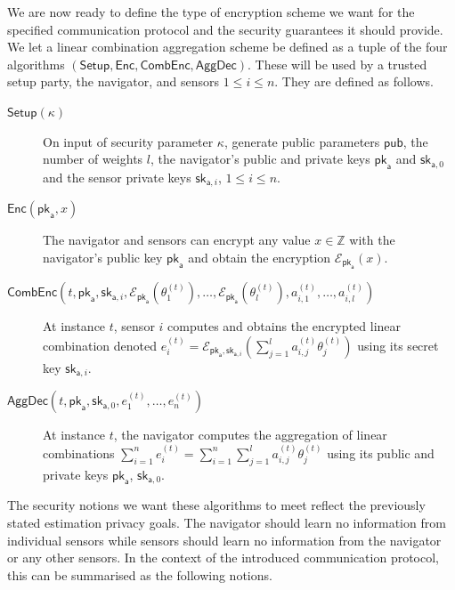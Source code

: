 We are now ready to define the type of encryption scheme we want for the specified communication protocol and the security guarantees it should provide. We let a linear combination aggregation scheme be defined as a tuple of the four algorithms $(\mathsf{Setup}, \mathsf{Enc}, \mathsf{CombEnc}, \mathsf{AggDec})$. These will be used by a trusted setup party, the navigator, and sensors $1\leq i\leq n$. They are defined as follows.
\begin{description}
    \item[$\mathsf{Setup}(\kappa)$] On input of security parameter $\kappa$, generate public parameters $\mathsf{pub}$, the number of weights $l$, the navigator's public and private keys $\mathsf{pk}_{\mathsf{a}}$ and $\mathsf{sk}_{\mathsf{a},0}$ and the sensor private keys $\mathsf{sk}_{\mathsf{a},i}$, $1\leq i\leq n$.
    \item[$\mathsf{Enc}(\mathsf{pk}_{\mathsf{a}}, x)$] The navigator and sensors can encrypt any value $x\in\mathbb{Z}$ with the navigator's public key $\mathsf{pk}_{\mathsf{a}}$ and obtain the encryption $\mathcal{E}_{\mathsf{pk}_{\mathsf{a}}}(x)$.
    \item[$\mathsf{CombEnc}(t, \mathsf{pk}_{\mathsf{a}}, \mathsf{sk}_{\mathsf{a},i}, \mathcal{E}_{\mathsf{pk}_{\mathsf{a}}}(\theta_1^{(t)}),\dots,\mathcal{E}_{\mathsf{pk}_{\mathsf{a}}}(\theta_l^{(t)}), a^{(t)}_{i,1},\dots,a^{(t)}_{i,l})$] At instance $t$, sensor $i$ computes and obtains the encrypted linear combination denoted $e^{(t)}_i = \mathcal{E}_{\mathsf{pk}_{\mathsf{a}},\mathsf{sk}_{\mathsf{a},i}}(\sum^l_{j=1}a^{(t)}_{i,j}\theta^{(t)}_j)$ using its secret key $\mathsf{sk}_{\mathsf{a},i}$.
    \item[$\mathsf{AggDec}(t, \mathsf{pk}_{\mathsf{a}}, \mathsf{sk}_{\mathsf{a},0}, e^{(t)}_1,\dots,e^{(t)}_n)$] At instance $t$, the navigator computes the aggregation of linear combinations $\sum^{n}_{i=1}e_i^{(t)}=\sum^{n}_{i=1}\sum^{l}_{j=1} a^{(t)}_{i,j}\theta^{(t)}_j$ using its public and private keys $\mathsf{pk}_{\mathsf{a}}$, $\mathsf{sk}_{\mathsf{a},0}$.
\end{description}
The security notions we want these algorithms to meet reflect the previously stated estimation privacy goals. The navigator should learn no information from individual sensors while sensors should learn no information from the navigator or any other sensors. In the context of the introduced communication protocol, this can be summarised as the following notions.
